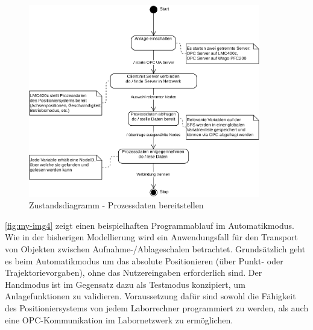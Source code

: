 \documentclass[../../../Bachelorarbeit.tex]{subfiles}
\begin{document}
\begin{figure}[H]
    \centering
    \includegraphics[width=0.9\textwidth]{Images/prozdata_zustand.pdf}
    \caption[Zustandsdiagramm Prozessdaten]{Zustandsdiagramm - Prozessdaten bereitstellen}
    \label{fig:my-img7}
\end{figure}

\autoref{fig:my-img4} zeigt einen beispielhaften Programmablauf im Automatikmodus. Wie in der bisherigen Modellierung wird ein Anwendungsfall für den Transport von Objekten zwischen Aufnahme-/Ablageschalen betrachtet. Grundsätzlich geht es beim Automatikmodus um das absolute Positionieren (über Punkt- oder Trajektorievorgaben), ohne das Nutzereingaben erforderlich sind. Der Handmodus ist im Gegensatz dazu als Testmodus konzipiert, um Anlagefunktionen zu validieren. Voraussetzung dafür sind sowohl die Fähigkeit des Positioniersystems von jedem Laborrechner programmiert zu werden, als auch eine OPC-Kommunikation im Labornetzwerk zu ermöglichen.
\end{document}

